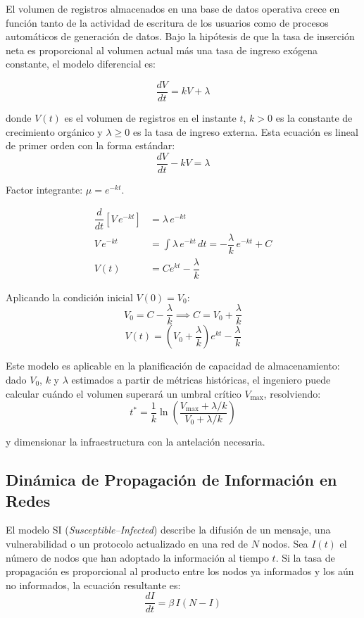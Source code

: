 \documentclass[12pt,letterpaper]{report}
\numberwithin{equation}{chapter}
\numberwithin{figure}{chapter}
\numberwithin{table}{chapter}
\begin{document}
El volumen de registros almacenados en una base de datos operativa crece en función tanto de la actividad de escritura de los usuarios como de procesos automáticos de generación de datos. Bajo la hipótesis de que la tasa de inserción neta es proporcional al volumen actual más una tasa de ingreso exógena constante, el modelo diferencial es:

\begin{equation*}
\dfrac{dV}{dt} = kV + \lambda
\end{equation*}

donde $V(t)$ es el volumen de registros en el instante $t$, $k > 0$ es la constante de crecimiento orgánico y $\lambda \geq 0$ es la tasa de ingreso externa. Esta ecuación es lineal de primer orden con la forma estándar:
\[
\dfrac{dV}{dt} - kV = \lambda
\]

Factor integrante: $\mu = e^{-kt}$.

\begin{align*}
\dfrac{d}{dt}\!\left[V\,e^{-kt}\right] &= \lambda\,e^{-kt} \\[4pt]
V\,e^{-kt} &= \int \lambda\,e^{-kt}\,dt = -\dfrac{\lambda}{k}\,e^{-kt} + C \\[4pt]
V(t) &= Ce^{kt} - \dfrac{\lambda}{k}
\end{align*}

Aplicando la condición inicial $V(0) = V_0$:
\[
V_0 = C - \dfrac{\lambda}{k} \implies C = V_0 + \dfrac{\lambda}{k}
\]
\[
\boxed{V(t) = \left(V_0 + \dfrac{\lambda}{k}\right)e^{kt} - \dfrac{\lambda}{k}}
\]

Este modelo es aplicable en la planificación de capacidad de almacenamiento: dado $V_0$, $k$ y $\lambda$ estimados a partir de métricas históricas, el ingeniero puede calcular cuándo el volumen superará un umbral crítico $V_{\max}$, resolviendo:
\[
t^* = \dfrac{1}{k}\ln\!\left(\dfrac{V_{\max} + \lambda/k}{V_0 + \lambda/k}\right)
\]

y dimensionar la infraestructura con la antelación necesaria.

\subsection{Dinámica de Propagación de Información en Redes}

El modelo SI (\textit{Susceptible–Infected}) describe la difusión de un mensaje, una vulnerabilidad o un protocolo actualizado en una red de $N$ nodos. Sea $I(t)$ el número de nodos que han adoptado la información al tiempo $t$. Si la tasa de propagación es proporcional al producto entre los nodos ya informados y los aún no informados, la ecuación resultante es:
\begin{equation*}
\dfrac{dI}{dt} = \beta\, I\!\left(N - I\right)
\end{equation*}
\end{document}
